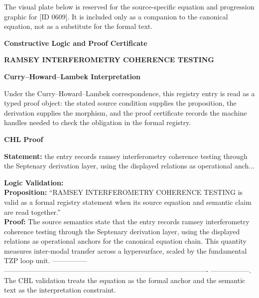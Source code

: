 \begingroup\footnotesize\sloppy
The visual plate below is reserved for the source-specific equation and progression graphic for [ID 0609]. It is included only as a companion to the canonical equation, not as a substitute for the formal text.
\par\endgroup
\ifTZPDarkEdition
{}
\fi

\clearpage
\begingroup\tzpsupportsetup
\noindent\textbf{\fontsize{10.8pt}{12.8pt}\selectfont [ID 0609] Constructive Logic and Proof Certificate}\par
\noindent\textbf{\fontsize{10pt}{12pt}\selectfont RAMSEY INTERFEROMETRY COHERENCE TESTING}\par
\vspace{0.45em}
\begingroup
\footnotesize
\setlength{\parskip}{0.22em}
\setlength{\parindent}{0pt}
\noindent\textbf{Curry--Howard--Lambek Interpretation}\par
Under the Curry--Howard--Lambek correspondence, this registry entry is read as a typed proof
object: the stated source condition supplies the proposition, the derivation supplies the
morphism, and the proof certificate records the machine handles needed to check the obligation
in the formal registry.

\vspace{0.45em}
\noindent\textbf{CHL Proof}\par
\textbf{Statement:} the entry records ramsey interferometry coherence testing through the Septenary
derivation layer, using the displayed relations as operational anch...

\textbf{Logic Validation:}\\
\textbf{Proposition:} ``RAMSEY INTERFEROMETRY COHERENCE TESTING is valid as a formal registry statement when its
source equation and semantic claim are read together.''\\
\textbf{Proof:} The source semantics state that the entry records ramsey interferometry coherence
testing through the Septenary derivation layer, using the displayed relations as
operational anchors for the canonical equation chain. This quantity measures inter-modal
transfer across a hypersurface, scaled by the fundamental TZP loop unit. ---------------
----------------------------------------------------------------------------------------
-----------------. The CHL validation treats the equation as the formal anchor and the
semantic text as the interpretation constraint.

